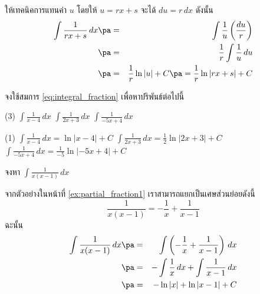 \begin{frame}
\begin{sol}
ให้เทคนิคการแทนค่า $u$ โดยให้ $u = rx + s$ จะได้ $du = r \, dx$ ดังนั้น\pa
\begin{eqnarray*}
\int \frac{1}{rx+s} \, dx \pa &=& \int \frac{1}{u} \left(\frac{du}{r}\right) \\
\pa &=& \frac{1}{r} \int \frac{1}{u} \, du \\
\pa &=& \frac{1}{r} \ln |u| + C \pa = \frac{1}{r} \ln |rx+s| + C
\end{eqnarray*}
\end{sol}
\end{frame}


\begin{frame}[t]
\begin{ex}
จงใช้สมการ \eqref{eq:integral_fraction} เพื่อหาปริพันธ์ต่อไปนี้
\begin{tasks}(3)
\task $\int \frac{1}{x-4} \, dx$
\task $\int \frac{1}{2x+3} \, dx $
\task $\int \frac{1}{-5x+4} \, dx $
\end{tasks}
\end{ex}
\begin{sol}
\begin{tasks}(1)
\task $\int \frac{1}{x-4} \, dx = \ln |x-4| + C$
\task $\int \frac{1}{2x+3} \, dx = \frac{1}{2} \ln | 2x+3 | + C$
\task $\int \frac{1}{-5x+4} \, dx = \frac{1}{-5} \ln | - 5x + 4| + C$
\end{tasks}
\end{sol}
\end{frame}



\begin{frame}[t]
\begin{ex}
จงหา $\int \frac{1}{x(x-1)} \, dx$
\end{ex}
\begin{sol}
จากตัวอย่างในหน้าที่ \ref{ex:partial_fraction1} เราสามารถแยกเป็นเศษส่วนย่อยดังนี้
\[\frac{1}{x(x-1)} = -\frac{1}{x} + \frac{1}{x-1}\] \pa
ฉะนั้น
\begin{eqnarray*}
\int \frac{1}{x(x-1)} \, dx \pa &=& \int \left(- \frac{1}{x} + \frac{1}{x-1} \right)\, dx \\
\pa &=& - \int \frac{1}{x} \, dx + \int \frac{1}{x-1} \, dx \\
\pa &=& - \ln |x| + \ln |x-1| + C
\end{eqnarray*}
\end{sol}
\end{frame}


